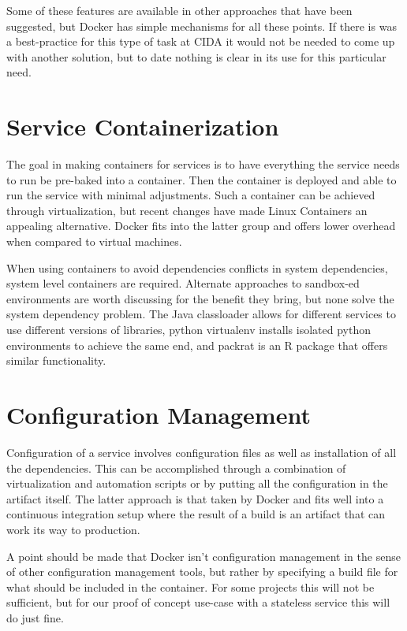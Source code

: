 \documentclass[twocolumn]{article}
\begin{document}
\par
Some of these features are available in other approaches that have been suggested, but Docker has simple mechanisms for all these points.
If there is was a best-practice for this type of task at CIDA it would not be needed to come up with another solution, but to date nothing is clear in its use for this particular need.

\section{Service Containerization}

The goal in making containers for services is to have everything the service needs to run be pre-baked into a container.
Then the container is deployed and able to run the service with minimal adjustments.
Such a container can be achieved through virtualization, but recent changes have made Linux Containers \cite{lxc} an appealing alternative.
Docker fits into the latter group and offers lower overhead when compared to virtual machines.

\par
When using containers to avoid dependencies conflicts in system dependencies, system level containers are required.
Alternate approaches to sandbox-ed environments are worth discussing for the benefit they bring, but none solve the system dependency problem.
The Java classloader allows for different services to use different versions of libraries, python virtualenv \cite{virtualenv} installs isolated python environments to achieve the same end, and packrat \cite{packrat} is an R package that offers similar functionality.

\section{Configuration Management}

Configuration of a service involves configuration files as well as installation of all the dependencies.
This can be accomplished through a combination of virtualization and automation scripts or by putting all the configuration in the artifact itself.
The latter approach is that taken by Docker and fits well into a continuous integration setup where the result of a build is an artifact that can work its way to production.

\par
A point should be made that Docker isn't configuration management in the sense of other configuration management tools, but rather by specifying a build file for what should be included in the container.
For some projects this will not be sufficient, but for our proof of concept use-case with a stateless service this will do just fine.
\end{document}

